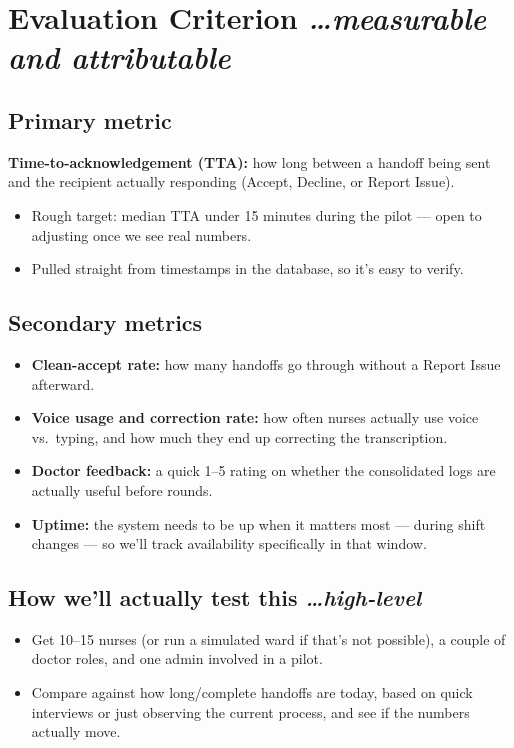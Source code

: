 \documentclass[11pt,a4paper]{article}
\newcommand{\BvrHint}[1]{%
  {\normalfont\normalsize\itshape\hfill #1}}
\begin{document}
\section{Evaluation Criterion %
\BvrHint{\ldots measurable and attributable}}
\subsection{Primary metric}
\textbf{Time-to-acknowledgement (TTA):} how long between a handoff being sent and the recipient actually responding (Accept, Decline, or Report Issue).
\begin{itemize}[leftmargin=0.7cm]
    \item Rough target: median TTA under 15 minutes during the pilot --- open to adjusting once we see real numbers.
    \item Pulled straight from timestamps in the database, so it's easy to verify.
\end{itemize}

\subsection{Secondary metrics}
\begin{itemize}[leftmargin=0.7cm]
    \item \textbf{Clean-accept rate:} how many handoffs go through without a Report Issue afterward.
    \item \textbf{Voice usage and correction rate:} how often nurses actually use voice vs.\ typing, and how much they end up correcting the transcription.
    \item \textbf{Doctor feedback:} a quick 1--5 rating on whether the consolidated logs are actually useful before rounds.
    \item \textbf{Uptime:} the system needs to be up when it matters most --- during shift changes --- so we'll track availability specifically in that window.
\end{itemize}

\subsection{How we'll actually test this %
\BvrHint{\ldots high-level}}
\begin{itemize}[leftmargin=0.7cm]
    \item Get 10--15 nurses (or run a simulated ward if that's not possible), a couple of doctor roles, and one admin involved in a pilot.
    \item Compare against how long/complete handoffs are today, based on quick interviews or just observing the current process, and see if the numbers actually move.
\end{itemize}
\end{document}
